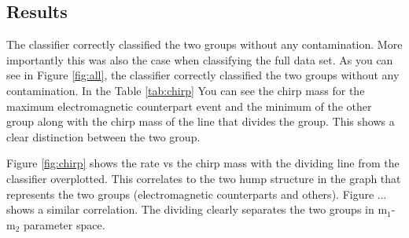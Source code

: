 \subsection{Results}
The classifier correctly classified the two groups without any contamination. More importantly this was also the case when classifying the full data set. As you can see in Figure \ref{fig:all}, the classifier correctly classified the two groups without any contamination. In the Table \ref{tab:chirp} You can see the chirp mass for the maximum electromagnetic counterpart event and the minimum of the other group along with the chirp mass of the line that divides the group. This shows a clear distinction between the two group.



Figure \ref{fig:chirp} shows the rate vs the chirp mass with the dividing line from the classifier overplotted. This correlates to the two hump structure in the graph that represents the two groups (electromagnetic counterparts and others). Figure ... shows a similar correlation. The dividing clearly separates the two groups in  m$_{1}$-m$_{2}$ parameter space.